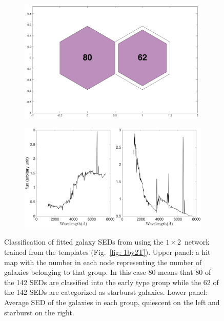             \begin{figure}
                \begin{subfigure}[b]{0.5\textwidth}
                    \centering
                    \includegraphics[width=\textwidth]{images0.01/1d/hit_v_1_by_2.png}
                \end{subfigure}
                \hfill
                \begin{subfigure}[b]{0.5\textwidth}
                     \includegraphics[width=\textwidth]{images0.01/1d/SED_total1by2.png}
                \end{subfigure}
                \caption{Classification of fitted galaxy SEDs from  using the $1\times2$~network trained from the  templates (Fig.~\ref{fig: 1by2T}). Upper panel: a hit map with the number in each node representing the number of galaxies belonging to that group. In this case 80 means that 80 of the 142 SEDs are classified into the early type group while the 62 of the 142 SEDs are categorized as starburst galaxies. Lower panel: Average SED of the galaxies in each group, quiescent on the left and starburst on the right.}
                \label{fig: 1by2V}
            \end{figure}          
            

